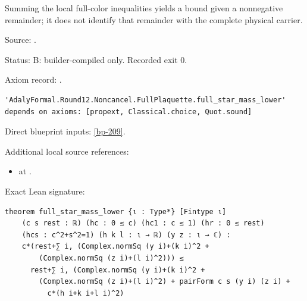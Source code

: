 \begin{theorem}[bp-210]
\label{bp-210}
\leanok
Summing the local full-color inequalities yields a bound given a nonnegative remainder; it does not identify that remainder with the complete physical carrier.

\par Source: \texttt{}.
\par Status: B: builder-compiled only. Recorded exit 0.
\par Axiom record: \texttt{}.
\begin{verbatim}
'AdalyFormal.Round12.Noncancel.FullPlaquette.full_star_mass_lower' depends on axioms: [propext, Classical.choice, Quot.sound]
\end{verbatim}
\par Direct blueprint inputs: \ref{bp-209}.
\par Additional local source references:
\begin{itemize}
\item \texttt{} at \texttt{}.
\end{itemize}
\par Exact Lean signature:
\begin{verbatim}
theorem full_star_mass_lower {ι : Type*} [Fintype ι]
    (c s rest : ℝ) (hc : 0 ≤ c) (hc1 : c ≤ 1) (hr : 0 ≤ rest)
    (hcs : c^2+s^2=1) (h k l : ι → ℝ) (y z : ι → ℂ) :
    c*(rest+∑ i, (Complex.normSq (y i)+(k i)^2 +
        (Complex.normSq (z i)+(l i)^2))) ≤
      rest+∑ i, (Complex.normSq (y i)+(k i)^2 +
        (Complex.normSq (z i)+(l i)^2) + pairForm c s (y i) (z i) +
          c*(h i+k i+l i)^2)
\end{verbatim}
\end{theorem}

